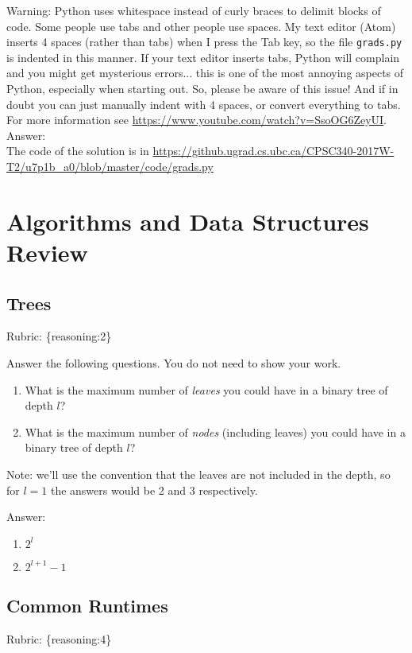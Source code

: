 \documentclass{article}
\def\rubric#1{\gre{Rubric: \{#1\}}}{}
\def\blu#1{{\color{blu}#1}}
\def\gre#1{{\color{gre}#1}}
\def\enum#1{\begin{enumerate}#1\end{enumerate}}
\begin{document}
Warning: Python uses whitespace instead of curly braces to delimit blocks of code.
Some people use tabs and other people use spaces. My text editor (Atom) inserts 4 spaces (rather than tabs) when
I press the Tab key, so the file \texttt{grads.py} is indented in this manner. If your text editor inserts tabs,
Python will complain and you might get mysterious errors... this is one of the most annoying aspects
of Python, especially when starting out. So, please be aware of this issue! And if in doubt you can just manually
indent with 4 spaces, or convert everything to tabs. For more information
see \url{https://www.youtube.com/watch?v=SsoOG6ZeyUI}.
\textcolor{gre}{
Answer:\\
The code of the solution is in \url{https://github.ugrad.cs.ubc.ca/CPSC340-2017W-T2/u7p1b_a0/blob/master/code/grads.py}
}
\section{Algorithms and Data Structures Review}

\subsection{Trees}
\rubric{reasoning:2}

\blu{Answer the following questions.} You do not need to show your work.

\begin{enumerate}
\item What is the maximum number of \emph{leaves} you could have in a binary tree of depth $l$?
\item What is the maximum number of \emph{nodes} (including leaves) you could have in a binary tree of depth $l$?
\end{enumerate}
Note: we'll use the convention that the leaves are not included in the depth, so for $l=1$ the answers would be 2 and 3 respectively.
\textcolor{gre}{
Answer:
\enum{
\item $2^l$
\item $2^{l+1}-1$
}}
\subsection{Common Runtimes}
\rubric{reasoning:4}
\end{document}
